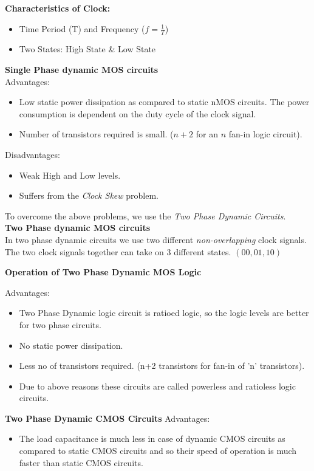 \documentclass[12pt, letterpaper]{article}
\begin{document}
\textbf{Characteristics of Clock:}
\begin{itemize}
    \item Time Period (T) and Frequency ($f = \frac{1}{T}$)
    \item Two States: High State \& Low State
\end{itemize}
\textbf{Single Phase dynamic MOS circuits} \\
Advantages:
\begin{itemize}
    \item Low static power dissipation as compared to static nMOS circuits. The power consumption is dependent on the duty cycle of the clock signal.
    \item Number of transistors required is small. ($n+2$ for an $n$ fan-in logic circuit).
\end{itemize}

Disadvantages:
\begin{itemize}
    \item Weak High and Low levels.
    \item Suffers from the \emph{Clock Skew} problem.
\end{itemize}

To overcome the above problems, we use the \emph{Two Phase Dynamic Circuits}. \\
\textbf{Two Phase dynamic MOS circuits} \\
In two phase dynamic circuits we use two different \emph{non-overlapping} clock signals. The two clock signals together can take on 3 different states. $(00,01,10)$

\textbf{Operation of Two Phase Dynamic MOS Logic}

Advantages:
\begin{itemize}
    \item Two Phase Dynamic logic circuit is ratioed logic, so the logic levels are better for two phase circuits.
    \item No static power dissipation.
    \item Less no of transistors required. (n+2 transistors for fan-in of 'n' transistors).
    \item Due to above reasons these circuits are called powerless and ratioless logic circuits.
\end{itemize}

\textbf{Two Phase Dynamic CMOS Circuits}
Advantages:
\begin{itemize}
    \item The load capacitance is much less in case of dynamic CMOS circuits as compared to static CMOS circuits and so their speed of operation is much faster than static CMOS circuits. 
\end{itemize}
 
\end{document}
